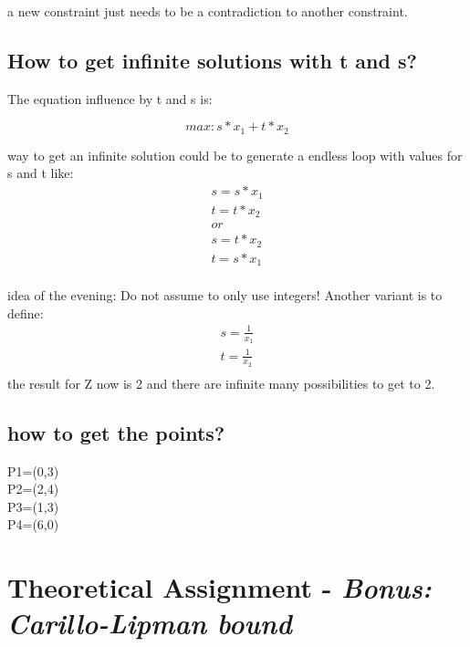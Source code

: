 \documentclass[%
   10pt,              %
   nenglish,           %
   a4paper,           %
   DIV11,             %
]{scrartcl}%
\begin{document}
\noindent a new constraint just needs to be a contradiction to another constraint.
	
\subsection*{How to get infinite solutions with t and s?}
The equation influence by t and s is:

\begin{equation*}
max: s*x_1+t*x_2
\end{equation*}

\noindent way to get an infinite solution could be to generate a endless loop with values for s and t like:
\begin{eqnarray*}
s=s*x_1\label{inf1}\\ 
t=t*x_2 \label{inf2}\\ 
or\\
s=t*x_2\label{inf3}\\ 
t=s*x_1 \label{inf4}\\ 
\end{eqnarray*}


\noindent idea of the evening:
Do not assume to only use integers!
Another variant is to define:
\begin{eqnarray*}
	s=\frac{1}{x_1}\\
	t=\frac{1}{x_2}\\ 
\end{eqnarray*}
the result for Z now is 2 and there are infinite many possibilities to get to 2.

\subsection*{how to get the points?}

P1=(0,3)\\
P2=(2,4)\\
P3=(1,3)\\
P4=(6,0)

\section*{Theoretical Assignment - \textsl{Bonus: Carillo-Lipman bound}}

%
%
 
\end{document}
